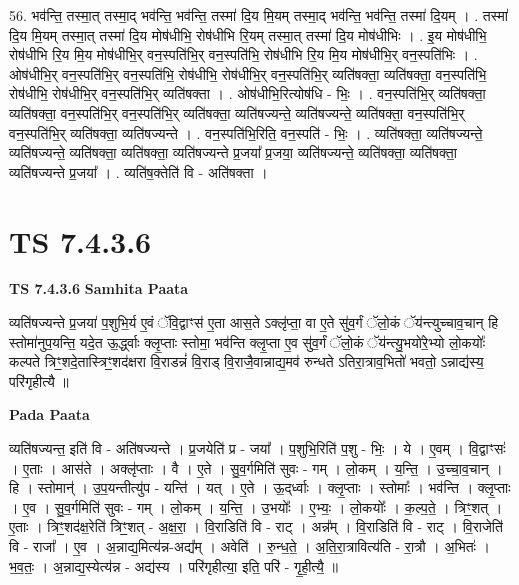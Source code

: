 \documentclass[17pt]{extarticle}
\begin{document}
56. भव॑न्ति॒ तस्मा॒त् तस्मा॒द् भव॑न्ति॒ भव॑न्ति॒ तस्मा॑ दि॒य मि॒यम् तस्मा॒द् भव॑न्ति॒ भव॑न्ति॒ तस्मा॑ दि॒यम् । . तस्मा॑ दि॒य मि॒यम् तस्मा॒त् तस्मा॑ दि॒य मोष॑धीभि॒ रोष॑धीभि रि॒यम् तस्मा॒त् तस्मा॑ दि॒य मोष॑धीभिः । . इ॒य मोष॑धीभि॒ रोष॑धीभि रि॒य मि॒य मोष॑धीभि॒र् वन॒स्पति॑भि॒र् वन॒स्पति॑भि॒ रोष॑धीभि रि॒य मि॒य मोष॑धीभि॒र् वन॒स्पति॑भिः । . ओष॑धीभि॒र् वन॒स्पति॑भि॒र् वन॒स्पति॑भि॒ रोष॑धीभि॒ रोष॑धीभि॒र् वन॒स्पति॑भि॒र् व्यति॑षक्ता॒ व्यति॑षक्ता॒ वन॒स्पति॑भि॒ रोष॑धीभि॒ रोष॑धीभि॒र् वन॒स्पति॑भि॒र् व्यति॑षक्ता । . ओष॑धीभि॒रित्योष॑धि - भिः॒ । . वन॒स्पति॑भि॒र् व्यति॑षक्ता॒ व्यति॑षक्ता॒ वन॒स्पति॑भि॒र् वन॒स्पति॑भि॒र् व्यति॑षक्ता॒ व्यति॑षज्यन्ते॒ व्यति॑षज्यन्ते॒ व्यति॑षक्ता॒ वन॒स्पति॑भि॒र् वन॒स्पति॑भि॒र् व्यति॑षक्ता॒ व्यति॑षज्यन्ते । . वन॒स्पति॑भि॒रिति॒ वन॒स्पति॑ - भिः॒ । . व्यति॑षक्ता॒ व्यति॑षज्यन्ते॒ व्यति॑षज्यन्ते॒ व्यति॑षक्ता॒ व्यति॑षक्ता॒ व्यति॑षज्यन्ते प्र॒जया᳚ प्र॒जया॒ व्यति॑षज्यन्ते॒ व्यति॑षक्ता॒ व्यति॑षक्ता॒ व्यति॑षज्यन्ते प्र॒जया᳚ । . व्यति॑ष॒क्तेति॑ वि - अति॑षक्ता । \newline
\pagebreak
{}

\section{ TS 7.4.3.6 }

\textbf{TS 7.4.3.6 } \newline
\textbf{Samhita Paata} \newline

व्यति॑षज्यन्ते प्र॒जया॑ प॒शुभि॒र्य ए॒वं ॅवि॒द्वाꣳस॑ ए॒ता आस॒ते ऽक्लृ॑प्ता॒ वा ए॒ते सु॑व॒र्गं ॅलो॒कं ॅय॑न्त्युच्चाव॒चान् हि स्तोमा॑नुप॒यन्ति॒ यदे॒त ऊ॒र्द्ध्वाः क्लृ॒प्ताः स्तोमा॒ भव॑न्ति क्लृ॒प्ता ए॒व सु॑व॒र्गं ॅलो॒कं ॅय॑न्त्यु॒भयो॑रे॒भ्यो लो॒कयोः᳚ कल्पते त्रिꣳ॒॒शदे॒तास्त्रिꣳ॒॒शद॑क्षरा वि॒राडन्नं॑ वि॒राड् वि॒राजै॒वान्नाद्य॒मव॑ रुन्धते ऽतिरा॒त्राव॒भितो॑ भवतो॒ ऽन्नाद्य॑स्य॒ परि॑गृहीत्यै ॥ \newline

\textbf{Pada Paata} \newline

व्यति॑षज्यन्त॒ इति॑ वि - अति॑षज्यन्ते । प्र॒जयेति॑ प्र - जया᳚ । प॒शुभि॒रिति॑ प॒शु - भिः॒ । ये । ए॒वम् । वि॒द्वाꣳसः॑ । ए॒ताः । आस॑ते । अक्लृ॑प्ताः । वै । ए॒ते । सु॒व॒र्गमिति॑ सुवः - गम् । लो॒कम् । य॒न्ति॒ । उ॒च्चा॒व॒चान् । हि । स्तोमान्॑ । उ॒प॒यन्तीत्यु॑प - यन्ति॑ । यत् । ए॒ते । ऊ॒द्‌र्ध्वाः । क्लृ॒प्ताः । स्तोमाः᳚ । भव॑न्ति । क्लृ॒प्ताः । ए॒व । सु॒व॒र्गमिति॑ सुवः - गम् । लो॒कम् । य॒न्ति॒ । उ॒भयोः᳚ । ए॒भ्यः॒ । लो॒कयोः᳚ । क॒ल्प॒ते॒ । त्रिꣳ॒॒शत् । ए॒ताः । त्रिꣳ॒॒शद॑क्ष॒रेति॑ त्रिꣳ॒॒शत् - अ॒क्ष॒रा॒ । वि॒राडिति॑ वि - राट् । अन्न᳚म् । वि॒राडिति॑ वि - राट् । वि॒राजेति॑ वि - राजा᳚ । ए॒व । अ॒न्नाद्य॒मित्य॑न्न-अद्य᳚म् । अवेति॑ । रु॒न्ध॒ते॒ । अ॒ति॒रा॒त्रावित्य॑ति - रा॒त्रौ । अ॒भितः॑ । भ॒व॒तः॒ । अ॒न्नाद्य॒स्येत्य॑न्न - अद्य॑स्य । परि॑गृहीत्या॒ इति॒ परि॑ - गृ॒ही॒त्यै॒ ॥  \newline
\end{document}
